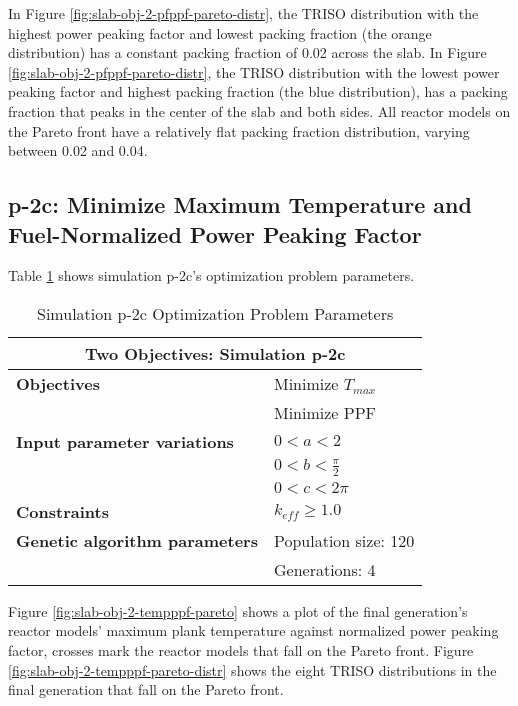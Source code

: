 In Figure \ref{fig:slab-obj-2-pfppf-pareto-distr}, the TRISO distribution with the 
highest power peaking factor and lowest packing fraction (the orange distribution) has 
a constant packing fraction of 0.02 across the slab. 
In Figure \ref{fig:slab-obj-2-pfppf-pareto-distr}, the TRISO distribution with the 
lowest power peaking factor and highest packing fraction (the blue distribution), has 
a packing fraction that peaks in the center of the slab and both sides. 
All reactor models on the Pareto front have a relatively flat packing fraction 
distribution, varying between 0.02 and 0.04. 

\subsection{p-2c: Minimize Maximum Temperature and Fuel-Normalized Power Peaking Factor}
\label{sec:p-2c}
Table \ref{tab:simulationp2c} shows simulation p-2c's optimization problem parameters. 
\begin{table}[htbp!]
    \centering
    \onehalfspacing
    \caption{Simulation p-2c Optimization Problem Parameters}
	\label{tab:simulationp2c}
    \footnotesize
    \begin{tabular}{l|p{3cm}}
    \hline 
    \multicolumn{2}{c}{\textbf{Two Objectives: Simulation p-2c}} \\
    \hline 
    \textbf{Objectives} & Minimize $T_{max}$ \\
    & Minimize PPF \\
    \hline 
    \textbf{Input parameter variations} & $0<a<2$ \\
    & $0<b<\frac{\pi}{2}$ \\
    & $0<c<2\pi$ \\
    \hline
    \textbf{Constraints} & $k_{eff} \geq 1.0$\\ 
    \hline 
    \textbf{Genetic algorithm parameters} & Population size: 120 \\
    & Generations: 4 \\
    \hline
    \end{tabular}
\end{table}
Figure \ref{fig:slab-obj-2-tempppf-pareto} shows a plot of the final generation's reactor models' 
maximum plank temperature against normalized power peaking factor, crosses mark the reactor 
models that fall on the Pareto front.
Figure \ref{fig:slab-obj-2-tempppf-pareto-distr} shows the eight TRISO distributions in 
the final generation that fall on the Pareto front. 
